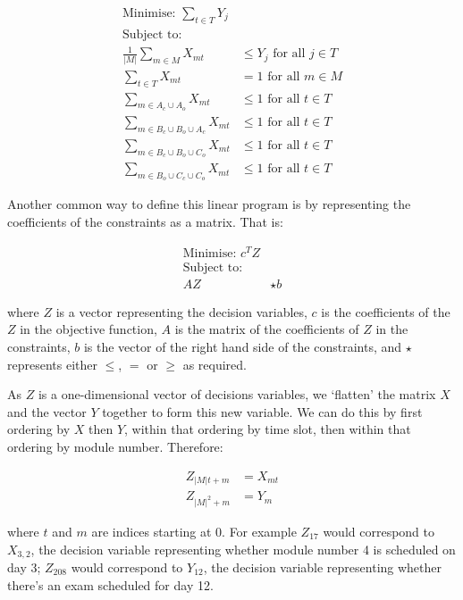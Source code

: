 \begin{align}
\text{Minimise: } \sum_{t \in T} Y_j & \label{eqn:objective_modules} \\
\text{Subject to: } & \nonumber \\
\frac{1}{|M|} \sum_{m \in M} X_{mt} &\leq Y_j \text{ for all } j \in T \label{eqn:auxiliary} \\
\sum_{t \in T} X_{mt} &= 1 \text{ for all } m \in M \label{eqn:schedule_all_modules} \\
\sum_{m \in A_c \cup A_o} X_{mt} &\leq 1 \text{ for all } t \in T \label{eqn:clique1} \\
\sum_{m \in B_c \cup B_o \cup A_c} X_{mt} &\leq 1 \text{ for all } t \in T \label{eqn:clique2} \\
\sum_{m \in B_c \cup B_o \cup C_o} X_{mt} &\leq 1 \text{ for all } t \in T \label{eqn:clique3} \\
\sum_{m \in B_o \cup C_c \cup C_o} X_{mt} &\leq 1 \text{ for all } t \in T \label{eqn:clique4}
\end{align}

Another common way to define this linear program is by representing the
coefficients of the constraints as a matrix.
That is:

\begin{align}
\text{Minimise: } c^T Z & \\
\text{Subject to: } & \nonumber \\
A Z & \star b
\end{align}

where $Z$ is a vector representing the decision variables, $c$ is the
coefficients of the $Z$ in the objective function, $A$ is the matrix of
the coefficients of $Z$ in the constraints, $b$ is the vector of the
right hand side of the constraints, and $\star$ represents either $\leq$, $=$ or
$\geq$ as required.

As $Z$ is a one-dimensional vector of decisions variables, we `flatten'
the matrix $X$ and the vector $Y$ together to form this new variable.
We can do this by first ordering by $X$ then $Y$, within that
ordering by time slot, then within that ordering by module number.
Therefore:

\begin{align}
Z_{|M|t + m} &= X_{mt}\\
Z_{|M|^2 + m} &= Y_m
\end{align}

where $t$ and $m$ are indices starting at 0.
For example $Z_{17}$ would correspond to $X_{3, 2}$, the decision variable
representing whether module number 4 is scheduled on day 3; $Z_{208}$ would
correspond to $Y_{12}$, the decision variable representing whether there's an
exam scheduled for day 12.

